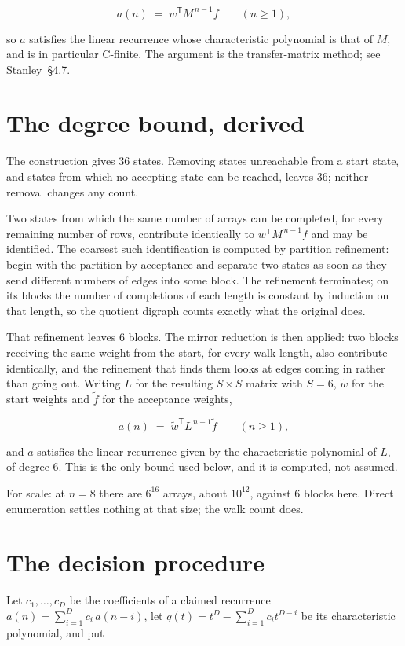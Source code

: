 \documentclass[11pt]{article}
\theoremstyle{definition}
\begin{document}
\[a(n) \;=\; w^{\mathsf T} M^{\,n-1} f \qquad (n \ge 1),\]

so $a$ satisfies the linear recurrence whose characteristic polynomial is that of $M$, and is in particular C-finite. The argument is the transfer-matrix method; see Stanley~\S4.7.

\section{The degree bound, derived}

The construction gives $36$ states. Removing states unreachable from a start state, and states from which no accepting state can be reached, leaves $36$; neither removal changes any count.

Two states from which the same number of arrays can be completed, for every remaining number of rows, contribute identically to $w^{\mathsf T}M^{\,n-1}f$ and may be identified. The coarsest such identification is computed by partition refinement: begin with the partition by acceptance and separate two states as soon as they send different numbers of edges into some block. The refinement terminates; on its blocks the number of completions of each length is constant by induction on that length, so the quotient digraph counts exactly what the original does.

That refinement leaves $6$ blocks. The mirror reduction is then applied: two blocks receiving the same weight from the start, for every walk length, also contribute identically, and the refinement that finds them looks at edges coming in rather than going out. Writing $L$ for the resulting $S \times S$ matrix with $S = 6$, $\tilde w$ for the start weights and $\tilde f$ for the acceptance weights,

\[a(n) \;=\; \tilde w^{\mathsf T} L^{\,n-1} \tilde f \qquad (n \ge 1),\]

and $a$ satisfies the linear recurrence given by the characteristic polynomial of $L$, of degree $6$. This is the only bound used below, and it is computed, not assumed.

For scale: at $n = 8$ there are $6^{16}$ arrays, about $10^{12}$, against $6$ blocks here. Direct enumeration settles nothing at that size; the walk count does.

\section{The decision procedure}

Let $c_1,\dots,c_D$ be the coefficients of a claimed recurrence $a(n) = \sum_{i=1}^{D} c_i\,a(n-i)$, let $q(t) = t^{D} - \sum_{i=1}^{D} c_i t^{D-i}$ be its characteristic polynomial, and put
\end{document}
